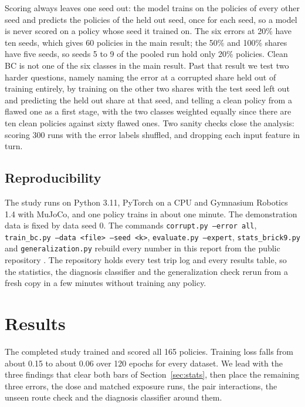 \documentclass[conference]{IEEEtran}
\begin{document}
Scoring always leaves one seed out: the model trains on the policies of every other seed and predicts the
policies of the held out seed, once for each seed, so a model is never scored on a policy whose seed it trained
on. The six errors at 20\% have ten seeds, which gives 60 policies in the main result; the 50\% and 100\% shares
have five seeds, so seeds 5 to 9 of the pooled run hold only 20\% policies. Clean BC is not one of the six classes
in the main result. Past that result we test two harder questions, namely naming the error at a corrupted share
held out of training entirely, by training on the other two shares with the test seed left out and predicting the
held out share at that seed, and telling a clean policy from a flawed one as a first stage, with the two classes
weighted equally since there are ten clean policies against sixty flawed ones. Two sanity checks close the
analysis: scoring 300 runs with the error labels shuffled, and dropping each input feature in turn.

\subsection{Reproducibility}
The study runs on Python 3.11, PyTorch on a CPU and Gymnasium Robotics 1.4 with MuJoCo, and one policy trains in
about one minute. The demonstration data is fixed by data seed 0. The commands \texttt{corrupt.py --error all},
\texttt{train\_bc.py --data <file> --seed <k>}, \texttt{evaluate.py --expert}, \texttt{stats\_brick9.py} and
\texttt{generalization.py} rebuild every number in this report from the public repository \cite{repo}. The
repository holds every test trip log and every results table, so the statistics, the diagnosis classifier and
the generalization check rerun from a fresh copy in a few minutes without training any policy.

\section{Results}\label{sec:results}

The completed study trained and scored all 165 policies. Training loss falls from about 0.15 to about 0.06 over
120 epochs for every dataset. We lead with the three findings that clear both bars of
Section~\ref{sec:stats}, then place the remaining three errors, the dose and matched exposure runs, the pair
interactions, the unseen route check and the diagnosis classifier around them.
\end{document}

